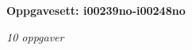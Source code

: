 \centerline{\bf Oppgavesett: i00239no-i00248no}
\vskip 10pt
\centerline{\it 10 oppgaver}\vskip 10pt
\vskip 10pt
